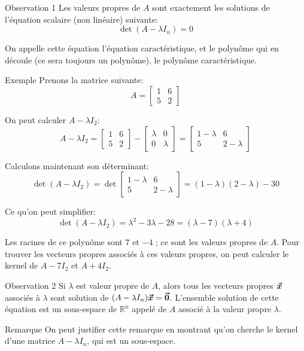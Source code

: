 \documentclass[a4paper]{article}
\begin{document}
\begin{parag}{Observation 1}
    Les valeurs propres de $A$ sont exactement les solutions de l'équation scalaire (non linéaire) suivante:
    \[\det\left(A - \lambda I_n\right) = 0\]

    On appelle cette équation l'équation caractéristique, et le polynôme qui en découle (ce sera toujours un polynôme), le polynôme caractéristique. 

    \begin{subparag}{Exemple}
        Prenons la matrice suivante: 
        \[A = \begin{bmatrix} 1 & 6 \\ 5 & 2 \end{bmatrix} \]

        On peut calculer $A - \lambda I_2$:
        \[A - \lambda I_2 = \begin{bmatrix} 1 & 6 \\ 5 & 2 \end{bmatrix} - \begin{bmatrix} \lambda & 0 \\ 0 & \lambda \end{bmatrix} = \begin{bmatrix} 1 - \lambda & 6 \\ 5 & 2 - \lambda \end{bmatrix} \]
        
        Calculons maintenant son déterminant: 
        \[\det\left(A - \lambda I_2\right) = \det\begin{bmatrix} 1 - \lambda & 6 \\ 5 & 2 - \lambda \end{bmatrix} = \left(1 - \lambda\right)\left(2 - \lambda\right) - 30\]

        Ce qu'on peut simplifier: 
        \[\det\left(A - \lambda I_2\right) = \lambda^2 - 3\lambda - 28 = \left(\lambda - 7\right)\left(\lambda + 4\right)\]
        
        Les racines de ce polynôme sont $7$ et $-4$ ; ce sont les valeurs propres de $A$. Pour trouver les vecteurs propres associés à ces valeurs propres, on peut calculer le kernel de $A - 7I_2$ et $A + 4I_2$.
    \end{subparag}
\end{parag}

\begin{parag}{Observation 2}
    Si $\lambda$ est valeur propre de $A$, alors tous les vecteurs propres $\bm{\protect\vec{x}}$ associés à $\lambda$ sont solution de $\left(A - \lambda I_n\right) \bvec{x} = \bvec{0}$. L'ensemble solution de cette équation est un sous-espace de $\mathbb{R}^{n}$ appelé  de $A$ associé à la valeur propre $\lambda$.

    \begin{subparag}{Remarque}
        On peut justifier cette remarque en montrant qu'on cherche le kernel d'une matrice $A - \lambda I_n$, qui est un sous-espace.
    \end{subparag}
    
\end{parag}
\end{document}

